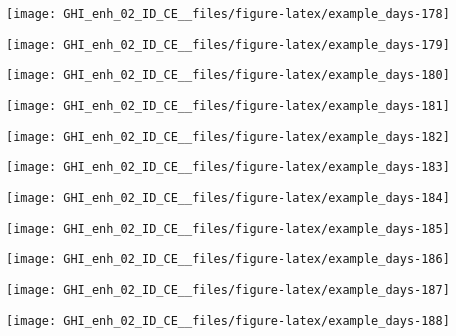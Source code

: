 \documentclass[
  10pt,
  a4paper,oneside]{article}
\begin{document}
\begin{center}\texttt{[image: GHI\_enh\_02\_ID\_CE\_\_files/figure-latex/example\_days-178]} \end{center}

\begin{center}\texttt{[image: GHI\_enh\_02\_ID\_CE\_\_files/figure-latex/example\_days-179]} \end{center}

\begin{center}\texttt{[image: GHI\_enh\_02\_ID\_CE\_\_files/figure-latex/example\_days-180]} \end{center}

\begin{center}\texttt{[image: GHI\_enh\_02\_ID\_CE\_\_files/figure-latex/example\_days-181]} \end{center}

\begin{center}\texttt{[image: GHI\_enh\_02\_ID\_CE\_\_files/figure-latex/example\_days-182]} \end{center}

\begin{center}\texttt{[image: GHI\_enh\_02\_ID\_CE\_\_files/figure-latex/example\_days-183]} \end{center}

\begin{center}\texttt{[image: GHI\_enh\_02\_ID\_CE\_\_files/figure-latex/example\_days-184]} \end{center}

\begin{center}\texttt{[image: GHI\_enh\_02\_ID\_CE\_\_files/figure-latex/example\_days-185]} \end{center}

\begin{center}\texttt{[image: GHI\_enh\_02\_ID\_CE\_\_files/figure-latex/example\_days-186]} \end{center}

\begin{center}\texttt{[image: GHI\_enh\_02\_ID\_CE\_\_files/figure-latex/example\_days-187]} \end{center}

\begin{center}\texttt{[image: GHI\_enh\_02\_ID\_CE\_\_files/figure-latex/example\_days-188]} \end{center}
\end{document}

